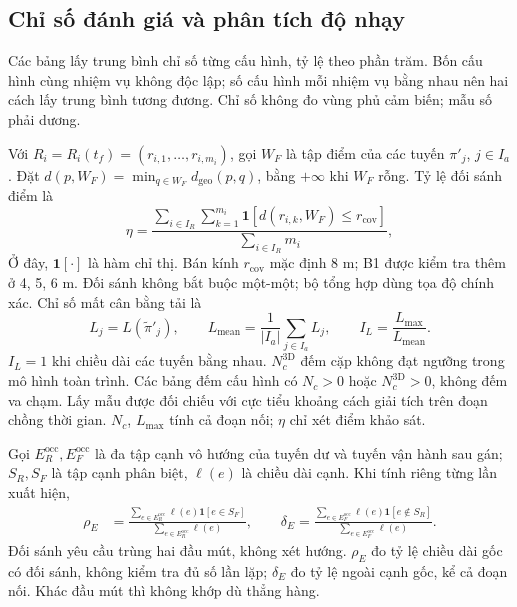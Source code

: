 \documentclass[11pt,a4paper]{article}
\newcommand{\Lmax}{L_{\mathrm{max}}}
\newcommand{\Nc}{N_{c}}
\begin{document}
\subsection{Chỉ số đánh giá và phân tích độ nhạy}

Các bảng lấy trung bình chỉ số từng cấu hình, tỷ lệ theo phần trăm. Bốn cấu hình cùng nhiệm vụ không độc lập; số cấu hình mỗi nhiệm vụ bằng nhau nên hai cách lấy trung bình tương đương. Chỉ số không đo vùng phủ cảm biến; mẫu số phải dương.

Với $R_i=R_i(t_f)=(r_{i,1},\ldots,r_{i,m_i})$, gọi $W_F$ là tập điểm của các tuyến $\pi'_j$, $j\in I_a$. Đặt $d(p,W_F)=\min_{q\in W_F}d_{\mathrm{geo}}(p,q)$, bằng $+\infty$ khi $W_F$ rỗng. Tỷ lệ đối sánh điểm là
\begin{equation}
 \eta=\frac{\displaystyle\sum_{i\in I_R}\sum_{k=1}^{m_i}
 \mathbf{1}\!\left[d(r_{i,k},W_F)\le r_{\mathrm{cov}}\right]}
 {\displaystyle\sum_{i\in I_R}m_i},
  \label{eq:recovery-ratio}
\end{equation}
Ở đây, $\mathbf1[\cdot]$ là hàm chỉ thị. Bán kính $r_{\mathrm{cov}}$ mặc định 8 m; B1 được kiểm tra thêm ở 4, 5, 6 m. Đối sánh không bắt buộc một-một; bộ tổng hợp dùng tọa độ chính xác. Chỉ số mất cân bằng tải là
\begin{equation}
  L_j=L(\widetilde\pi'_j),\qquad
  L_{\mathrm{mean}}=\frac{1}{|I_a|}\sum_{j\in I_a}L_j,\qquad
  I_L=\frac{L_{\max}}{L_{\mathrm{mean}}}.
\end{equation}
$I_L=1$ khi chiều dài các tuyến bằng nhau. $N_c^{\mathrm{3D}}$ đếm cặp không đạt ngưỡng trong mô hình toàn trình. Các bảng đếm cấu hình có $\Nc>0$ hoặc $N_c^{\mathrm{3D}}>0$, không đếm va chạm. Lấy mẫu được đối chiếu với cực tiểu khoảng cách giải tích trên đoạn chồng thời gian. $\Nc$, $\Lmax$ tính cả đoạn nối; $\eta$ chỉ xét điểm khảo sát.

Gọi $E_R^{\mathrm{occ}},E_F^{\mathrm{occ}}$ là đa tập cạnh vô hướng của tuyến dư và tuyến vận hành sau gán; $S_R,S_F$ là tập cạnh phân biệt, $\ell(e)$ là chiều dài cạnh. Khi tính riêng từng lần xuất hiện,
\begin{equation}
\begin{aligned}
 \rho_E&=\frac{\sum_{e\in E_R^{\mathrm{occ}}}\ell(e)\mathbf{1}[e\in S_F]}
 {\sum_{e\in E_R^{\mathrm{occ}}}\ell(e)},\qquad
 \delta_E=\frac{\sum_{e\in E_F^{\mathrm{occ}}}\ell(e)\mathbf{1}[e\notin S_R]}
 {\sum_{e\in E_F^{\mathrm{occ}}}\ell(e)}.
\end{aligned}
\end{equation}
Đối sánh yêu cầu trùng hai đầu mút, không xét hướng. $\rho_E$ đo tỷ lệ chiều dài gốc có đối sánh, không kiểm tra đủ số lần lặp; $\delta_E$ đo tỷ lệ ngoài cạnh gốc, kể cả đoạn nối. Khác đầu mút thì không khớp dù thẳng hàng.
\end{document}
